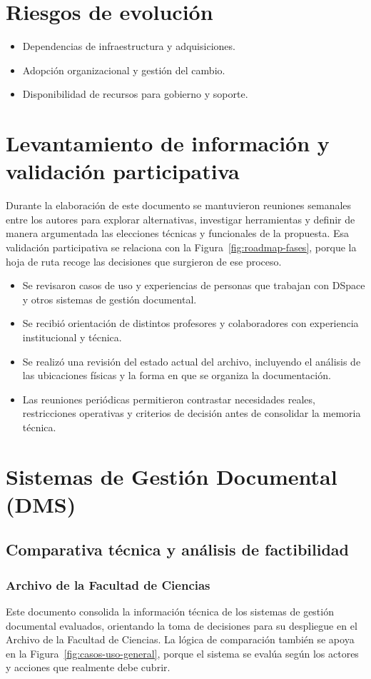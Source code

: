 \section{Riesgos de evolución}
\begin{itemize}
  \item Dependencias de infraestructura y adquisiciones.
  \item Adopción organizacional y gestión del cambio.
  \item Disponibilidad de recursos para gobierno y soporte.
\end{itemize}

\section{Levantamiento de información y validación participativa}
Durante la elaboración de este documento se mantuvieron reuniones semanales entre los autores para explorar alternativas, investigar herramientas y definir de manera argumentada las elecciones técnicas y funcionales de la propuesta.
Esa validación participativa se relaciona con la Figura~\ref{fig:roadmap-fases}, porque la hoja de ruta recoge las decisiones que surgieron de ese proceso.

\begin{itemize}
  \item Se revisaron casos de uso y experiencias de personas que trabajan con DSpace y otros sistemas de gestión documental.
  \item Se recibió orientación de distintos profesores y colaboradores con experiencia institucional y técnica.
  \item Se realizó una revisión del estado actual del archivo, incluyendo el análisis de las ubicaciones físicas y la forma en que se organiza la documentación.
  \item Las reuniones periódicas permitieron contrastar necesidades reales, restricciones operativas y criterios de decisión antes de consolidar la memoria técnica.
\end{itemize}

\section{Sistemas de Gestión Documental (DMS)}
\subsection{Comparativa técnica y análisis de factibilidad}
\subsubsection{Archivo de la Facultad de Ciencias}
Este documento consolida la información técnica de los sistemas de gestión documental evaluados, orientando la toma de decisiones para su despliegue en el Archivo de la Facultad de Ciencias.
La lógica de comparación también se apoya en la Figura~\ref{fig:casos-uso-general}, porque el sistema se evalúa según los actores y acciones que realmente debe cubrir.

